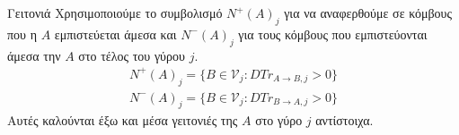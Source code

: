 {}
\begin{definitiongr}{Γειτονιά}
  \label{neighbourhood}
  Χρησιμοποιούμε το συμβολισμό $N^{+}\left(A\right)_j$ για να αναφερθούμε σε κόμβους που η $A$ εμπιστεύεται άμεσα και
  $N^{-}\left(A\right)_j$ για τους κόμβους που εμπιστεύονται άμεσα την $A$ στο τέλος του γύρου $j$.
  \begin{equation}
  \begin{gathered}
    N^{+}\left(A\right)_j = \{B \in \mathcal{V}_j : DTr_{A \rightarrow B, j} > 0\} \\
    N^{-}\left(A\right)_j = \{B \in \mathcal{V}_j : DTr_{B \rightarrow A, j} > 0\}
  \end{gathered}
  \end{equation}
  Αυτές καλούνται έξω και μέσα γειτονιές της $A$ στο γύρο $j$ αντίστοιχα.
\end{definitiongr}
